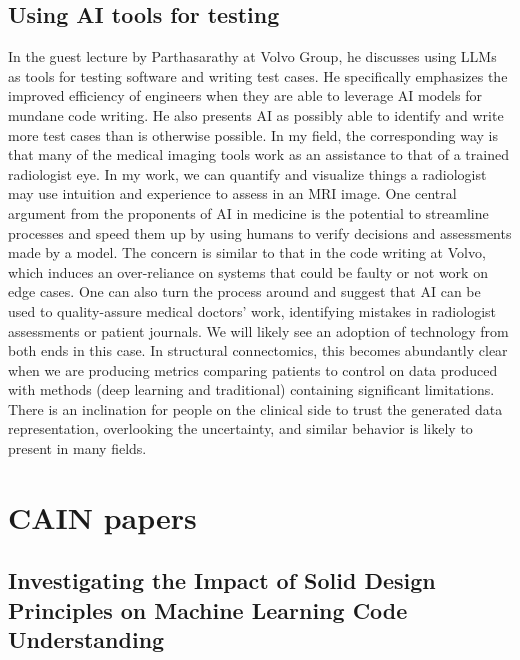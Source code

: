 \documentclass[a4paper, 11pt]{article}
\begin{document}
\subsection{Using AI tools for testing}
In the guest lecture by Parthasarathy at Volvo Group, he discusses using LLMs as tools for testing software and writing test cases. He specifically emphasizes the improved efficiency of engineers when they are able to leverage AI models for mundane code writing. He also presents AI as possibly able to identify and write more test cases than is otherwise possible. In my field, the corresponding way is that many of the medical imaging tools work as an assistance to that of a trained radiologist eye. In my work, we can quantify and visualize things a radiologist may use intuition and experience to assess in an MRI image. One central argument from the proponents of AI in medicine is the potential to streamline processes and speed them up by using humans to verify decisions and assessments made by a model. The concern is similar to that in the code writing at Volvo, which induces an over-reliance on systems that could be faulty or not work on edge cases. One can also turn the process around and suggest that AI can be used to quality-assure medical doctors' work, identifying mistakes in radiologist assessments or patient journals. We will likely see an adoption of technology from both ends in this case. In structural connectomics, this becomes abundantly clear when we are producing metrics comparing patients to control on data produced with methods (deep learning and traditional) containing significant limitations. There is an inclination for people on the clinical side to trust the generated data representation, overlooking the uncertainty, and similar behavior is likely to present in many fields. 


\section{CAIN papers}


\subsection{Investigating the Impact of Solid Design Principles on Machine Learning Code Understanding}
\end{document}
